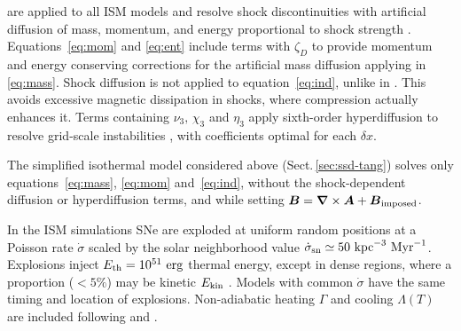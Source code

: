 \documentclass[preprint2]{aastex63}
\newcommand\SNr{\dot\sigma_{\rm sn}}
\newcommand\ESK{E_{\rm kin}}
\newcommand\EST{E_{\rm th}}
\newcommand{\vect}[1]{{{\mbox{\boldmath $#1$}}}}%
\newcommand\kpc{~ {\rm kpc}}
\newcommand\dx{ {\delta x}}
\newcommand\Myr{~ {\rm Myr}}
\newcommand\erg{~ {\rm erg}}
\newcommand{\fg}[1]{\textcolor{midgreen}{#1}}
\newcommand{\mm}[1]{\textcolor{mypurple}{#1}}
\begin{document}
 \fg{are applied to all ISM models and} resolve shock
 discontinuities with artificial diffusion of mass, momentum, and energy
 proportional to shock strength \citep[see][for details]{GMKSH20}.
 \fg{Equations~\eqref{eq:mom} and \eqref{eq:ent} include terms with
   $\zeta_D$} \mm{to} \fg{provide momentum and energy conserving
   corrections for} \mm{the} \fg{artificial mass
 diffusion applying in \eqref{eq:mass}.}
 Shock diffusion is not applied to equation~\eqref{eq:ind}\fg{,
   unlike} \mm{in} \fg{
 \citet{Gent:2013b}.} \mm{This avoids} \fg{excessive magnetic dissipation in
 shocks, where compression actually enhances it.}
 Terms containing $\nu_3,\,\chi_3$ and $\eta_3$ apply sixth-order hyperdiffusion
 to resolve grid-scale instabilities \citep[see, e.g.,][]{ABGS02,HB04}, \fg{
 with coefficients optimal for each $\dx$}.

 \fg{The simplified isothermal model considered above
 (Sect.\,\ref{sec:ssd-tang}) solves only
 equations~\fg{\eqref{eq:mass},} \eqref{eq:mom} and~\eqref{eq:ind},
 without the
 shock-dependent diffusion or hyperdiffusion terms, and while setting
 $\vect{B}=\vect\nabla\times\vect{A}+\vect{B}_{\rm imposed}$.}

 \fg{In the ISM simulations} SNe are exploded at \fg{uniform} random positions
 at a Poisson rate $\dot\sigma$
 \mm{scaled by}
 the solar neighborhood
 value $\SNr\simeq 50\kpc^{-3}\Myr^{-1}$.
 Explosions inject $\EST = 10^{51}\erg$ thermal energy, except in
 dense regions, where a proportion \fg{($<5\%$) may be} kinetic $\ESK$ 
 \citep[see][]{GMKSH20}.
 \fg{Models with common $\dot\sigma$ have the same timing and location of
 explosions.}
 Non-adiabatic heating $\Gamma$ and cooling $\Lambda (T)$ are included
 \citep{Gent:2013b} following \citet{Wolfire:1995} and \citet{Sarazin:1987}.
\end{document}
